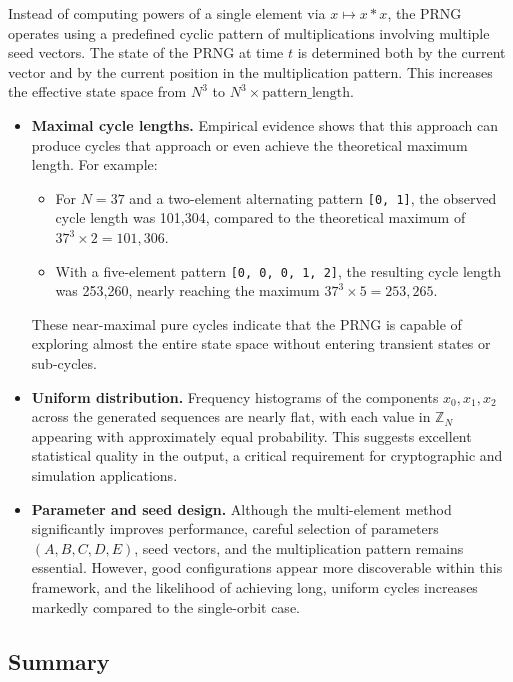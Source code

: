 \documentclass[12pt]{article}
\theoremstyle{definition}
\theoremstyle{plain}
\theoremstyle{remark}
\begin{document}
Instead of computing powers of a single element via \( x \mapsto x * x \), the PRNG operates using a predefined cyclic pattern of multiplications involving multiple seed vectors. The state of the PRNG at time \( t \) is determined both by the current vector and by the current position in the multiplication pattern. This increases the effective state space from \( N^3 \) to \( N^3 \times \text{pattern\_length} \).

\begin{itemize}
    \item \textbf{Maximal cycle lengths.} Empirical evidence shows that this approach can produce cycles that approach or even achieve the theoretical maximum length. For example:
    \begin{itemize}
        \item For \( N = 37 \) and a two-element alternating pattern \texttt{[0, 1]}, the observed cycle length was 101,304, compared to the theoretical maximum of \( 37^3 \times 2 = 101,306 \).
        \item With a five-element pattern \texttt{[0, 0, 0, 1, 2]}, the resulting cycle length was 253,260, nearly reaching the maximum \( 37^3 \times 5 = 253,265 \).
    \end{itemize}
    These near-maximal pure cycles indicate that the PRNG is capable of exploring almost the entire state space without entering transient states or sub-cycles.

    \item \textbf{Uniform distribution.} Frequency histograms of the components \( x_0, x_1, x_2 \) across the generated sequences are nearly flat, with each value in \( \mathbb{Z}_N \) appearing with approximately equal probability. This suggests excellent statistical quality in the output, a critical requirement for cryptographic and simulation applications.

    \item \textbf{Parameter and seed design.} Although the multi-element method significantly improves performance, careful selection of parameters \( (A, B, C, D, E) \), seed vectors, and the multiplication pattern remains essential. However, good configurations appear more discoverable within this framework, and the likelihood of achieving long, uniform cycles increases markedly compared to the single-orbit case.
\end{itemize}

\subsection*{Summary}
\end{document}
